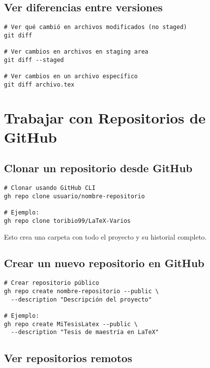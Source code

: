 \documentclass[12pt,a4paper]{article}
\begin{document}
\subsection{Ver diferencias entre versiones}

\begin{lstlisting}[style=bashstyle]
# Ver qué cambió en archivos modificados (no staged)
git diff

# Ver cambios en archivos en staging area
git diff --staged

# Ver cambios en un archivo específico
git diff archivo.tex
\end{lstlisting}

\section{Trabajar con Repositorios de GitHub}

\subsection{Clonar un repositorio desde GitHub}

\begin{lstlisting}[style=bashstyle]
# Clonar usando GitHub CLI
gh repo clone usuario/nombre-repositorio

# Ejemplo:
gh repo clone toribio99/LaTeX-Varios
\end{lstlisting}

Esto crea una carpeta con todo el proyecto y su historial completo.

\subsection{Crear un nuevo repositorio en GitHub}

\begin{lstlisting}[style=bashstyle]
# Crear repositorio público
gh repo create nombre-repositorio --public \
  --description "Descripción del proyecto"

# Ejemplo:
gh repo create MiTesisLatex --public \
  --description "Tesis de maestría en LaTeX"
\end{lstlisting}

\subsection{Ver repositorios remotos}
\end{document}
